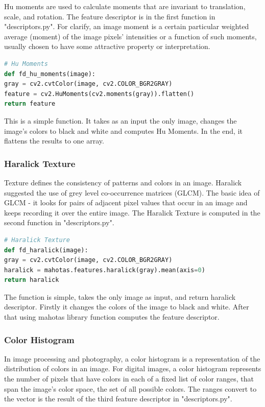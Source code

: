 \documentclass[12pt]{article}
\begin{document}
Hu moments are used to calculate moments that are invariant to translation, scale, and rotation. The feature descriptor is in the first function in "descriptors.py". For clarify, an image moment is a certain particular weighted average (moment) of the image pixels' intensities or a function of such moments, usually chosen to have some attractive property or interpretation.

\begin{lstlisting}[language=Python]
# Hu Moments
def fd_hu_moments(image):
gray = cv2.cvtColor(image, cv2.COLOR_BGR2GRAY)
feature = cv2.HuMoments(cv2.moments(gray)).flatten()
return feature
\end{lstlisting}

This is a simple function. It takes as an input the only image, changes the image's colors to black and white and computes Hu Moments. In the end, it flattens the results to one array.

\subsubsection{Haralick Texture}

Texture defines the consistency of patterns and colors in an image. Haralick suggested the use of grey level co-occurrence matrices (GLCM). The basic idea of GLCM - it looks for pairs of adjacent pixel values that occur in an image and keeps recording it over the entire image. The Haralick Texture is computed in the second function in "descriptors.py".

\begin{lstlisting}[language=Python]
# Haralick Texture
def fd_haralick(image):
gray = cv2.cvtColor(image, cv2.COLOR_BGR2GRAY)
haralick = mahotas.features.haralick(gray).mean(axis=0)
return haralick
\end{lstlisting}

The function is simple, takes the only image as input, and return haralick descriptor. Firstly it changes the colors of the image to black and white. After that using mahotas library function computes the feature descriptor.

\subsubsection{Color Histogram}

In image processing and photography, a color histogram is a representation of the distribution of colors in an image. For digital images, a color histogram represents the number of pixels that have colors in each of a fixed list of color ranges, that span the image's color space, the set of all possible colors. The ranges convert to the vector is the result of the third feature descriptor in "descriptors.py".
\end{document}
